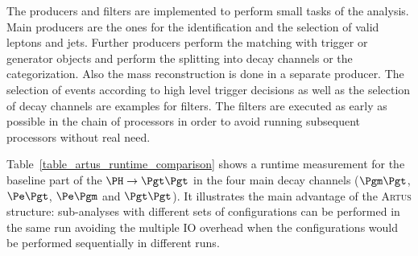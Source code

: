\documentclass[3p]{elsarticle}
\newcommand{\software}[1]{\textsc{#1}\xspace}
\newcommand{\artus}{\software{Artus}}
\begin{document}
The producers and filters are implemented to perform small tasks of the analysis.
Main producers are the ones for the identification and the selection of valid leptons and jets.
Further producers perform the matching with trigger or generator objects and perform the splitting into decay channels or the categorization.
Also the mass reconstruction is done in a separate producer.
The selection of events according to high level trigger decisions as well as the selection of decay channels are examples for filters.
The filters are executed as early as possible in the chain of processors in order to avoid running subsequent processors without real need.

Table~\ref{table_artus_runtime_comparison} shows a runtime measurement for the baseline part of the $\PH\to\Pgt\Pgt$ in the four main decay channels ($\Pgm\Pgt$, $\Pe\Pgt$, $\Pe\Pgm$ and $\Pgt\Pgt$).
It illustrates the main advantage of the \artus structure: sub-analyses with different sets of configurations can be performed in the same run avoiding the multiple IO overhead when the configurations would be performed sequentially in different runs.
\end{document}
